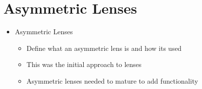 \section{Asymmetric Lenses}
\label{sec:asymmetric-lenses}
\begin{itemize}
    \item Asymmetric Lenses
        \begin{itemize}
            \item Define what an asymmetric lens is and how its used
            \item This was the initial approach to lenses
            \item Asymmetric lenses needed to mature to add functionality
        \end{itemize}
\end{itemize}

